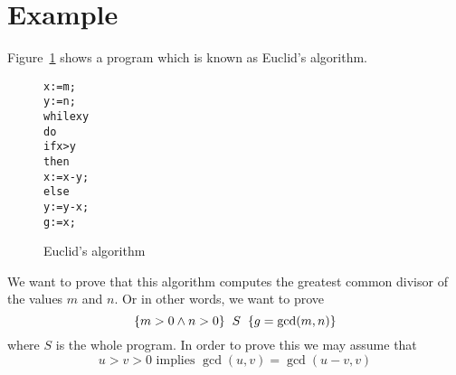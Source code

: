 \documentclass[10pt]{article}
\begin{document}
\section{Example}
Figure~\ref{fig:euclid} shows a 
program which is known as Euclid's algorithm.
\begin{figure}[hb]
\begin{center}
\begin{varwidth}{3cm}
\begin{alltt}
x:=m;
y:=n;
while x{\mneq}y
do
  if x>y
  then
    x:=x-y;
  else
    y:=y-x;
g:=x;
\end{alltt}
\end{varwidth}
\end{center}
\caption{Euclid's algorithm}
\label{fig:euclid}
\end{figure}
We want to prove that this algorithm computes the greatest common divisor
of the values $m$ and $n$.
Or in other words, we want to prove 
\begin{equation}
\label{eqn:euclidgoal}
\{m>0 \land n>0\}\hspace*{0.2cm} S \hspace*{0.2cm} \{g=\gcd(m,n)\}
\end{equation}
where $S$ is the whole program.
In order to prove this we may assume that
\begin{equation}
\label{eqn:euclidhint}
u>v>0 \mbox{ implies } \gcd(u,v)=\gcd(u-v,v)
\end{equation}
\end{document}

